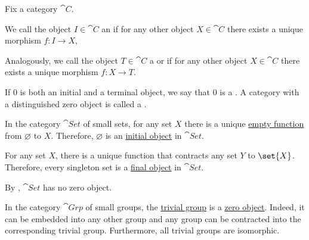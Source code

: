 \begin{definition}\label{def:zero_objects}
  Fix a category \( \cat{C} \).

  \begin{thmenum}
     We call the object \( I \in \cat{C} \) an  if for any other object \( X \in \cat{C} \) there exists a unique morphism \( f: I \to X \),

     Analogously, we call the object \( T \in \cat{C} \) a  or  if for any other object \( X \in \cat{C} \) there exists a unique morphism \( f: X \to T \).

     If \( 0 \) is both an initial and a terminal object, we say that \( 0 \) is a . A category with a distinguished zero object is called a .
  \end{thmenum}
\end{definition}

\begin{example}\label{ex:def:zero_objects}
  In the category \hyperref[def:category_of_small_sets]{\( \cat{Set} \)} of small sets, for any set \( X \) there is a unique \hyperref[def:multi_valued_function/empty]{empty function} from \( \varnothing \) to \( X \). Therefore, \( \varnothing \) is an \hyperref[def:zero_objects/initial]{initial object} in \( \cat{Set} \).

  For any set \( X \), there is a unique function that contracts any set \( Y \) to \( \set{ X } \). Therefore, every singleton set is a \hyperref[def:zero_objects/final]{final object} in \( \cat{Set} \).

  By , \( \cat{Set} \) has no zero object.

  In the category \hyperref[def:group/category]{\( \cat{Grp} \)} of small groups, the \hyperref[def:group/trivial]{trivial group} is a \hyperref[def:zero_objects/zero]{zero object}. Indeed, it can be embedded into any other group and any group can be contracted into the corresponding trivial group. Furthermore, all trivial groups are isomorphic.
\end{example}

